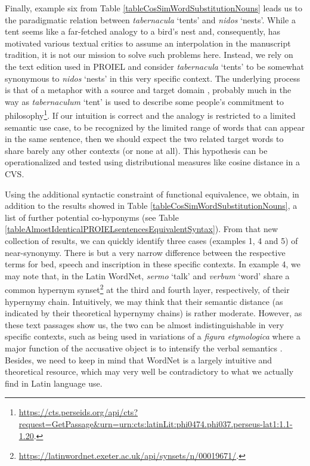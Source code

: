 Finally, example six from Table \ref{tableCosSimWordSubstitutionNouns} leads us to the paradigmatic relation between \textit{tabernacula} `tents' and \textit{nidos} `nests'. While a tent seems like a far-fetched analogy to a bird's nest and, consequently, has motivated various textual critics to assume an interpolation in the manuscript tradition, it is not our mission to solve such problems here. Instead, we rely on the text edition used in PROIEL and consider \textit{tabernacula} `tents' to be somewhat synonymous to \textit{nidos} `nests' in this very specific context. The underlying process is that of a metaphor with a source and target domain \parencite[275]{pantherMetaphorMetonymyLanguage2017}, probably much in the way as \textit{tabernaculum} `tent' is used to describe some people's commitment to philosophy\footnote{\url{https://cts.perseids.org/api/cts?request=GetPassage&urn=urn:cts:latinLit:phi0474.phi037.perseus-lat1:1.1-1.20}.}. If our intuition is correct and the analogy is restricted to a limited semantic use case, to be recognized by the limited range of words that can appear in the same sentence, then we should expect the two related target words to share barely any other contexts (or none at all). This hypothesis can be operationalized and tested using distributional measures like cosine distance in a \gls{CVS}.

Using the additional syntactic constraint of functional equivalence, we obtain, in addition to the results showed in Table \ref{tableCosSimWordSubstitutionNouns}, a list of further potential co-hyponyms (see Table \ref{tableAlmostIdenticalPROIELsentencesEquivalentSyntax}). From that new collection of results, we can quickly identify three cases (examples 1, 4 and 5) of near-synonymy. There is but a very narrow difference between the respective terms for bed, speech and inscription in these specific contexts. In example 4, we may note that, in the Latin WordNet, \textit{sermo} `talk' and \textit{verbum} `word' share a common hypernym synset\footnote{\url{https://latinwordnet.exeter.ac.uk/api/synsets/n/00019671/}.} at the third and fourth layer, respectively, of their hypernymy chain. Intuitively, we may think that their semantic distance (as indicated by their theoretical hypernymy chains) is rather moderate. However, as these text passages show us, the two can be almost indistinguishable in very specific contexts, such as being used in variations of a \textit{figura etymologica} where a major function of the accusative object is to intensify the verbal semantics \parencite[438]{mengeLehrbuchLateinischenSyntax2009}. Besides, we need to keep in mind that WordNet is a largely intuitive and theoretical resource, which may very well be contradictory to what we actually find in Latin language use. 

